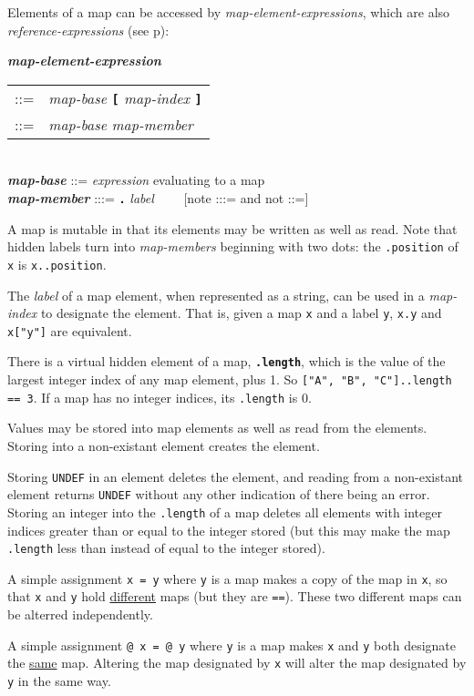 \documentclass[12pt]{article}
\newcommand{\TT}[1]{{\tt \bfseries #1}}
\newcommand{\emkey}[1]{{\em \bfseries #1}}
\newcommand{\ttdkey}[1]{{\tt \bfseries .#1}}
\newcommand{\pagref}[1]{p\pageref{#1}}
\newenvironment{indpar}[1][0.3in]%
	{\begin{list}{}%
		     {\setlength{\itemsep}{0in}%
		      \setlength{\topsep}{0in}%
		      \setlength{\parsep}{1ex}%
		      \setlength{\labelwidth}{#1}%
		      \setlength{\leftmargin}{#1}%
		      \addtolength{\leftmargin}{\labelsep}}%
	 \item}%
	{\end{list}}
\begin{document}
Elements of a map can be accessed by {\em map-element-expressions}, which
are also {\em reference-expressions} (see \pagref{REFERENCE-EXPRESSIONS}):

\begin{indpar}
\emkey{map-element-expression}
    \begin{tabular}[t]{rl}
    ::= & {\em map-base} \TT{[} {\em map-index} \TT{]} \\
    ::= & {\em map-base} {\em map-member} \\
    \end{tabular}
\\[0.5ex]
\emkey{map-base} ::= {\em expression} evaluating to a map
\\[0.5ex]
\emkey{map-member} :::= \TT{.} {\em label} ~~~~[note :::= and not ::=]
\end{indpar}

A map is mutable in that its elements may be written as well as read.
Note that hidden labels turn into {\em map-members} beginning with
two dots: the {\tt .position} of {\tt x} is {\tt x..position}.

The {\em label} of a map element, when represented as a string, can
be used in a {\em map-index} to designate the element.  That is,
given a map {\tt x} and a label {\tt y}, {\tt x.y} and {\tt x["y"]}
are equivalent.

There is a virtual hidden element of a map, \ttdkey{length}, which is
the value of the largest integer index of any map element,
plus 1.  So {\tt ["A", "B", "C"]..length == 3}.  If a map has no
integer indices, its {\tt .length} is 0.

Values may be stored into map elements as well as read from the
elements.  Storing into a non-existant element creates the element.

Storing {\tt UNDEF} in an element deletes the element, and reading
from a non-existant element returns {\tt UNDEF} without any other
indication of there being an error.  Storing an integer into the
{\tt .length} of a map deletes all elements with integer indices
greater than or equal to the integer stored (but this may make
the map {\tt .length} less than instead of equal to the integer stored).

A simple assignment {\tt x = y} where {\tt y} is a map makes
a copy of the map in {\tt x}, so that {\tt x} and {\tt y} hold
\underline{different} maps (but they are {\tt ==}).  These two different maps
can be alterred independently.

A simple assignment {\tt @ x = @ y} where {\tt y} is a map makes
{\tt x} and {\tt y} both designate the \underline{same} map.
Altering the map designated by {\tt x} will alter the map
designated by {\tt y} in the same way.
\end{document}
